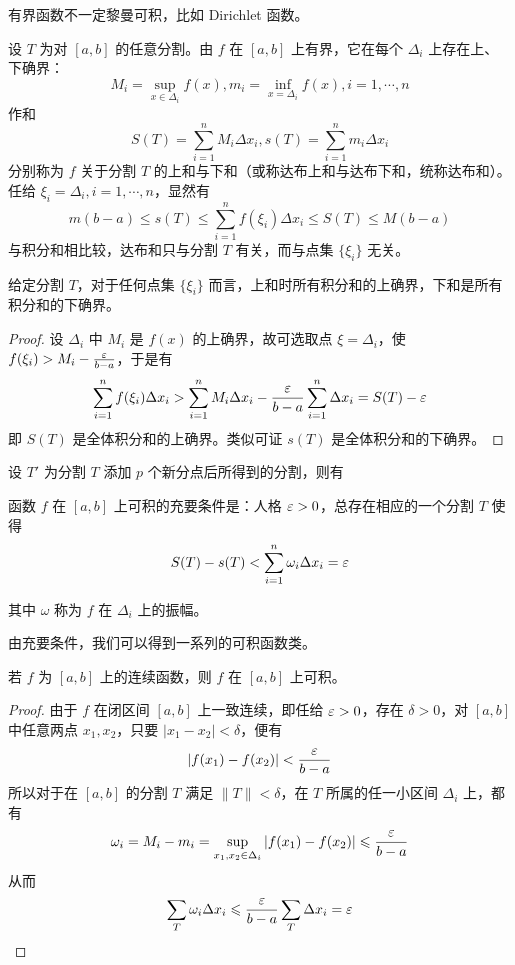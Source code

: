 有界函数不一定黎曼可积，比如 Dirichlet 函数。

设 $T$ 为对 $[a,b]$ 的任意分割。由 $f$ 在 $[a,b]$ 上有界，它在每个 $\Delta_i$ 上存在上、下确界：
\[ M_i=\sup_{x\in\Delta_i}f(x),m_i = \inf_{x=\Delta_i}f(x),i=1,\cdots,n \]
作和
\[ S(T) = \sum_{i=1}^nM_i\Delta x_i, s(T) = \sum_{i=1}^n m_i \Delta x_i \]
分别称为 $f$ 关于分割 $T$ 的上和与下和（或称达布上和与达布下和，统称达布和）。任给 $\xi_i = \Delta_i,i=1,\cdots,n$，显然有
\[ m(b-a) \leqslant s(T) \leqslant \sum_{i=1}^n f(\xi_i)\Delta x_i \leqslant S(T) \leqslant M(b-a) \]
与积分和相比较，达布和只与分割 $T$ 有关，而与点集 $\{\xi_i\}$ 无关。

\begin{proposition}
	给定分割 $T$，对于任何点集 $\{\xi_i\}$ 而言，上和时所有积分和的上确界，下和是所有积分和的下确界。
\end{proposition}
\begin{proof}
	设 $\Delta_i$ 中 $M_i$ 是 $f(x)$ 的上确界，故可选取点 $\xi=\Delta_i$，使 $f(\xi_i)>M_i-\frac{\varepsilon}{b-a}$，于是有
	\[ \sum_{i=1}^nf(\xi_i)\Delta x_i > \sum_{i=1}^nM_i\Delta x_i-\frac{\varepsilon}{b-a}\sum_{i=1}^n\Delta x_i = S(T)-\varepsilon \]
	即 $S(T)$ 是全体积分和的上确界。类似可证 $s(T)$ 是全体积分和的下确界。
\end{proof}


\begin{proposition}
	设 $T'$ 为分割 $T$ 添加 $p$ 个新分点后所得到的分割，则有

\end{proposition}

\begin{theorem}
	函数 $f$ 在 $[a,b]$ 上可积的充要条件是：人格 $\varepsilon >0$，总存在相应的一个分割 $T$ 使得
	\[ S(T) - s(T) < \sum_{i=1}^n\omega_i\Delta x_i = \varepsilon \]
\end{theorem}

其中 $\omega$ 称为 $f$ 在 $\Delta_i$ 上的振幅。

由充要条件，我们可以得到一系列的可积函数类。

\begin{theorem}
	若 $f$ 为 $[a,b]$ 上的连续函数，则 $f$ 在 $[a,b]$ 上可积。
\end{theorem}
\begin{proof}
	由于 $f$ 在闭区间 $[a,b]$ 上一致连续，即任给 $\varepsilon > 0$，存在 $\delta>0$，对 $[a,b]$ 中任意两点 $x_1,x_2$，只要 $|x_1-x_2|<\delta$，便有
	\[ |f(x_1)-f(x_2)| < \frac{\varepsilon}{b-a} \]
	所以对于在 $[a,b]$ 的分割 $T$ 满足 $\|T\| < \delta$，在 $T$ 所属的任一小区间 $\Delta_i$ 上，都有
	\[ \omega_i = M_i-m_i = \sup_{x_1,x_2\in\Delta_i}|f(x_1)-f(x_2)| \leqslant \frac{\varepsilon}{b-a} \]
	从而
	\[ \sum_{T}\omega_i\Delta x_i \leqslant \frac{\varepsilon}{b-a}\sum_T\Delta x_i = \varepsilon \]
\end{proof}



